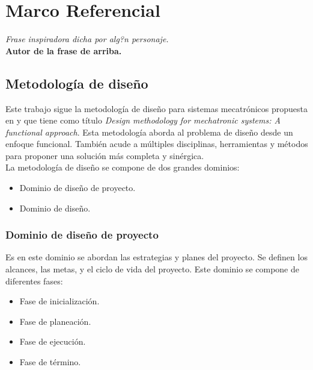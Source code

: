 \chapter{Marco Referencial} \label{ch:marcoref}

\begin{flushright}
\small\textit{Frase inspiradora dicha por alg?n personaje.}\\
		\small\textbf{Autor de la frase de arriba.}
\end{flushright}

	\section{Metodolog\'ia de dise\~{n}o} \label{sec:metodologia}
Este trabajo sigue la metodolog\'ia de dise\~{n}o para sistemas mecatr\'onicos propuesta en \cite{diegoflores_2018} y que tiene como t\'itulo \textit{Design methodology for mechatronic systems: A functional approach}. Esta metodolog\'ia aborda al problema de dise\~{n}o desde un enfoque funcional. Tambi\'en acude a m\'ultiples disciplinas, herramientas y m\'etodos para proponer una soluci\'on m\'as completa y sin\'ergica.\\

\noindent La metodolog\'ia de dise\~{n}o se compone de dos grandes dominios:

\begin{itemize}
	\item Dominio de dise\~{n}o de proyecto.
	\item Dominio de dise\~{n}o.
\end{itemize}

		\subsection*{Dominio de dise\~{n}o de proyecto}
\noindent Es en este dominio se abordan las estrategias y planes del proyecto. Se definen los alcances, las metas, y el ciclo de vida del proyecto. Este dominio se compone de diferentes fases:

\begin{itemize}
	\item Fase de inicializaci\'on. 
	\item Fase de planeaci\'on.
	\item Fase de ejecuci\'on.
	\item Fase de t\'ermino.
\end{itemize}

